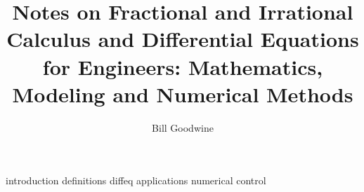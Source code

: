 \documentclass{book}
\title{Notes on Fractional and Irrational Calculus and Differential Equations for Engineers: Mathematics, Modeling and Numerical Methods}
\author{Bill Goodwine}
\begin{document}
\maketitle
\tableofcontents

{introduction}
{definitions}
{diffeq}
{applications}
{numerical}
{control}

\backmatter


\end{document}
